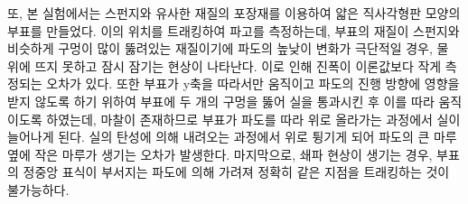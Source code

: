 


또, 본 실험에서는 스펀지와 유사한 재질의 포장재를 이용하여 얇은 직사각형판 모양의 부표를 만들었다. 이의 위치를 트래킹하여 파고를 측정하는데, 부표의 재질이 스펀지와 비슷하게 구멍이 많이 뚫려있는 재질이기에 파도의 높낮이 변화가 극단적일 경우, 물 위에 뜨지 못하고 잠시 잠기는 현상이 나타난다. 이로 인해 진폭이 이론값보다 작게 측정되는 오차가 있다. 또한 부표가 y축을 따라서만 움직이고 파도의 진행 방향에 영향을 받지 않도록 하기 위하여 부표에 두 개의 구멍을 뚫어 실을 통과시킨 후 이를 따라 움직이도록 하였는데, 마찰이 존재하므로 부표가 파도를 따라 위로 올라가는 과정에서 실이 늘어나게 된다. 실의 탄성에 의해 내려오는 과정에서 위로 튕기게 되어 파도의 큰 마루 옆에 작은 마루가 생기는 오차가 발생한다. 마지막으로, 쇄파 현상이 생기는 경우, 부표의 정중앙 표식이 부서지는 파도에 의해 가려져 정확히 같은 지점을 트래킹하는 것이 불가능하다.

